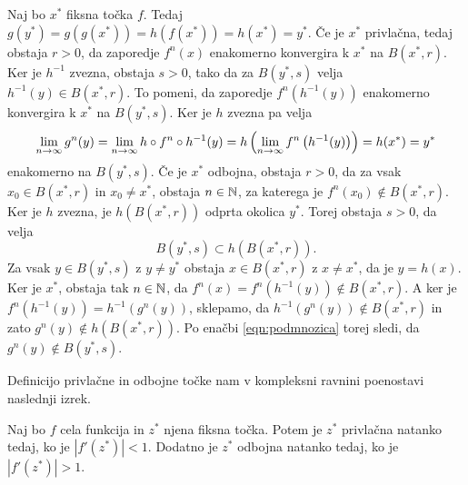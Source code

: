 \begin{dokaz}
    Naj bo \(x^*\) fiksna točka \(f\). Tedaj \(g (y^*) = g (g (x^*)) = h (f (x^*)) = h (x^*) = y^*\). Če je \(x^*\) privlačna, tedaj obstaja \(r > 0\), da zaporedje \(f^n (x)\) enakomerno konvergira k \(x^*\) na \(B (x^*, r)\). Ker je \(h^{-1}\) zvezna, obstaja \(s > 0\), tako da za \(B (y^*, s)\) velja \(h^{-1} (y) \in B (x^*, r)\). To pomeni, da zaporedje \(f^n (h^{-1} (y))\) enakomerno konvergira k \(x^*\) na \(B (y^*, s)\). Ker je \(h\) zvezna pa velja
    \[\lim_{n \to \infty} g^n (y) = \lim_{n \to \infty} h \circ f^n \circ h^{-1} (y) = h \left( \lim_{n \to \infty} f^n \left( h^{-1} (y) \right) \right) = h (x^*) = y^*\]
    enakomerno na \(B (y^*, s)\). Če je \(x^*\) odbojna, obstaja \(r > 0\), da za vsak \(x_0 \in B (x^*, r)\) in \(x_0 \neq x^*\), obstaja \(n \in \mathbb N\), za katerega je \(f^n (x_0) \notin B (x^*, r)\). Ker je \(h\) zvezna, je \(h (B (x^*, r))\) odprta okolica \(y^*\). Torej obstaja \(s > 0\), da velja
    \begin{equation} \label{eqn:podmnozica}
        B (y^*, s) \subset h (B (x^*, r)).
    \end{equation}
    Za vsak \(y \in B (y^*, s)\) z \(y \neq y^*\) obstaja \(x \in B (x^*, r)\) z \(x \neq x^*\), da je \(y = h (x)\). Ker je \(x^*\), obstaja tak \(n \in \mathbb N\), da \(f^n (x) = f^n (h^{-1} (y)) \notin B (x^*, r)\). A ker je \(f^n (h^{-1} (y)) = h^{-1} (g^n (y))\), sklepamo, da \(h^{-1} (g^n (y)) \notin B (x^*, r)\) in zato \(g^n (y) \notin h (B (x^*, r))\). Po enačbi \eqref{eqn:podmnozica} torej sledi, da \(g^n (y) \notin B (y^*, s)\).
\end{dokaz}

\noindent Definicijo privlačne in odbojne točke nam v kompleksni ravnini poenostavi naslednji izrek.

\begin{izrek}
    Naj bo \(f\) cela funkcija in \(z^*\) njena fiksna točka. Potem je \(z^*\) privlačna natanko tedaj, ko je \(|f' (z^*)| < 1\). Dodatno je \(z^*\) odbojna natanko tedaj, ko je \(|f' (z^*)| > 1\).
\end{izrek}

